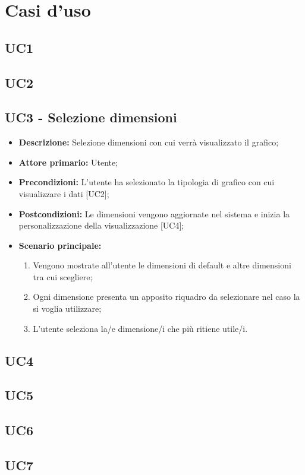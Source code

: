 \chapter{Casi d'uso}

\section{UC1}

\section{UC2}

\section{UC3 - Selezione dimensioni}
 \begin{itemize}
     \item \textbf{Descrizione:} Selezione dimensioni con cui verrà visualizzato il grafico;
     \item \textbf{Attore primario:} Utente;
     \item \textbf{Precondizioni:} L'utente ha selezionato la tipologia di grafico con cui visualizzare i dati [UC2];
     \item \textbf{Postcondizioni:} Le dimensioni vengono aggiornate nel sistema e inizia la personalizzazione della visualizzazione [UC4];
     \item \textbf{Scenario principale:}
     \begin{enumerate}
         \item Vengono mostrate all'utente le dimensioni di default e altre dimensioni tra cui scegliere;
         \item Ogni dimensione presenta un apposito riquadro da selezionare nel caso la si voglia utilizzare;
         \item L'utente seleziona la/e dimensione/i che più ritiene utile/i.
     \end{enumerate}
 \end{itemize}

\section{UC4}

\section{UC5}

\section{UC6}

\section{UC7}
